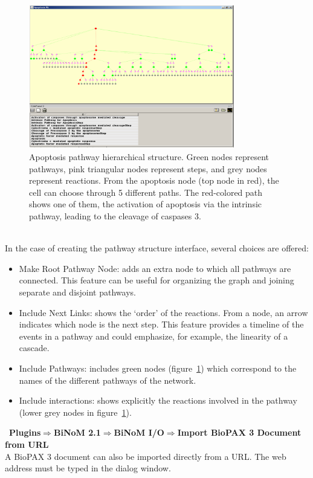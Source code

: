 \begin{figure}
\centering
\includegraphics[width=0.8\textwidth]{graphics/Apoptosis_pathway_hierarchical_structure}
\caption{Apoptosis pathway hierarchical structure. Green nodes represent pathways, pink triangular nodes represent steps, and grey nodes represent reactions. From the apoptosis node (top node in red), the cell can choose through 5 different paths. The red-colored path shows one of them, the activation of apoptosis via the intrinsic pathway, leading to the cleavage of caspases 3.}
\label{Apoptosis_pathway_hierarchical_structure}
\end{figure}
\\In the case of creating the pathway structure interface, several choices are offered:
\begin{itemize}
\item Make Root Pathway Node: adds an extra node to which all pathways are connected. This feature can be useful for organizing the graph and joining separate and disjoint pathways.
\item Include Next Links: shows the ‘order’ of the reactions. From a node, an arrow indicates which node is the next step. This feature provides a timeline of the events in a pathway and could emphasize, for example, the linearity of a cascade.
\item Include Pathways: includes green nodes (figure~\ref{Apoptosis_pathway_hierarchical_structure}) which correspond to the names of the different pathways of the network.
\item Include interactions: shows explicitly the reactions involved in the pathway (lower grey nodes in figure~\ref{Apoptosis_pathway_hierarchical_structure}).
\end{itemize}\
\textbf{Plugins$\Rightarrow$BiNoM 2.1$\Rightarrow$BiNoM I/O$\Rightarrow$Import BioPAX 3 Document from URL}\\
A BioPAX 3 document can also be imported directly from a URL. The web address must be typed in the dialog window.


